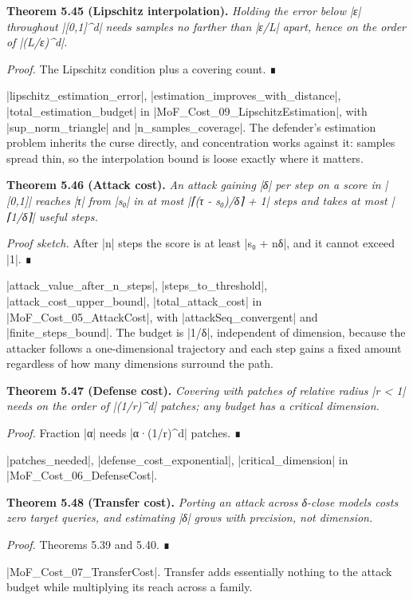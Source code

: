 \documentclass{memoir}
\begin{document}
\textbf{Theorem 5.45 (Lipschitz interpolation).} \emph{Holding the error below \LeanVerb|ε| throughout
\LeanVerb|[0,1]^d| needs samples no farther than \LeanVerb|ε/L| apart, hence on the order of
\LeanVerb|(L/ε)^d|.}

\emph{Proof.} The Lipschitz condition plus a covering count. ∎

\LeanVerb|lipschitz_estimation_error|, \LeanVerb|estimation_improves_with_distance|,
\LeanVerb|total_estimation_budget| in \LeanVerb|MoF_Cost_09_LipschitzEstimation|, with
\LeanVerb|sup_norm_triangle| and \LeanVerb|n_samples_coverage|. The defender's estimation problem
inherits the curse directly, and concentration works against it: samples spread
thin, so the interpolation bound is loose exactly where it matters.

\textbf{Theorem 5.46 (Attack cost).} \emph{An attack gaining \LeanVerb|δ| per step on a score in \LeanVerb|[0,1]|
reaches \LeanVerb|τ| from \LeanVerb|s₀| in at most \LeanVerb|⌈(τ - s₀)/δ⌉ + 1| steps and takes at most
\LeanVerb|⌈1/δ⌉| useful steps.}

\emph{Proof sketch.} After \LeanVerb|n| steps the score is at least \LeanVerb|s₀ + nδ|, and it cannot exceed
\LeanVerb|1|. ∎

\LeanVerb|attack_value_after_n_steps|, \LeanVerb|steps_to_threshold|, \LeanVerb|attack_cost_upper_bound|,
\LeanVerb|total_attack_cost| in \LeanVerb|MoF_Cost_05_AttackCost|, with \LeanVerb|attackSeq_convergent| and
\LeanVerb|finite_steps_bound|. The budget is \LeanVerb|1/δ|, independent of dimension, because the
attacker follows a one-dimensional trajectory and each step gains a fixed amount
regardless of how many dimensions surround the path.

\textbf{Theorem 5.47 (Defense cost).} \emph{Covering with patches of relative radius \LeanVerb|r < 1| needs on
the order of \LeanVerb|(1/r)^d| patches; any budget has a critical dimension.}

\emph{Proof.} Fraction \LeanVerb|α| needs \LeanVerb|α·(1/r)^d| patches. ∎

\LeanVerb|patches_needed|, \LeanVerb|defense_cost_exponential|, \LeanVerb|critical_dimension| in
\LeanVerb|MoF_Cost_06_DefenseCost|.

\textbf{Theorem 5.48 (Transfer cost).} \emph{Porting an attack across δ-close models costs zero target
queries, and estimating \LeanVerb|δ| grows with precision, not dimension.}

\emph{Proof.} Theorems 5.39 and 5.40. ∎

\LeanVerb|MoF_Cost_07_TransferCost|. Transfer adds essentially nothing to the attack
budget while multiplying its reach across a family.
\end{document}
